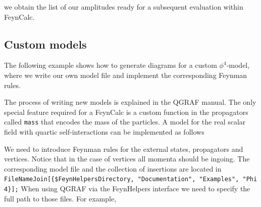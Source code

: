 \documentclass[../FeynHelpersManual.tex]{subfiles}
\begin{document}
we obtain the list of our amplitudes ready for a subsequent evaluation
within FeynCalc.

\subsection{Custom models}\label{custom-models}

The following example shows how to generate diagrams for a custom
\(\phi^4\)-model, where we write our own model file and implement the
corresponding Feynman rules.

The process of writing new models is explained in the QGRAF manual. The
only special feature required for a FeynCalc is a custom function in the
propagators called \texttt{mass} that encodes the mass of the particles.
A model for the real scalar field with quartic self-interactions can be
implemented as follows

\begin{Shaded}
\begin{Highlighting}[]
\OperatorTok{[}\ExtensionTok{=}\SpecialCharTok{\^{}}\NormalTok{\textquotesingle{} }\OperatorTok{]}

\SpecialCharTok{\%}
\OperatorTok{[}\OperatorTok{,}\OperatorTok{,} \SpecialCharTok{+}\ExtensionTok{=}\OperatorTok{]}

\SpecialCharTok{\%}
\OperatorTok{[}\OperatorTok{,}\OperatorTok{,}\OperatorTok{,}\OperatorTok{]}
\end{Highlighting}
\end{Shaded}

We need to introduce Feynman rules for the external states, propagators
and vertices. Notice that in the case of vertices all momenta should be
ingoing. The corresponding model file and the collection of insertions
are located in
\texttt{FileNameJoin[\allowbreak{}\{\allowbreak{}\$FeynHelpersDirectory,\ \allowbreak{}"Documentation",\ \allowbreak{}"Examples",\ \allowbreak{}"Phi4\}];}
When using QGRAF via the FeynHelpers interface we need to specify the
full path to those files. For example,
\end{document}
